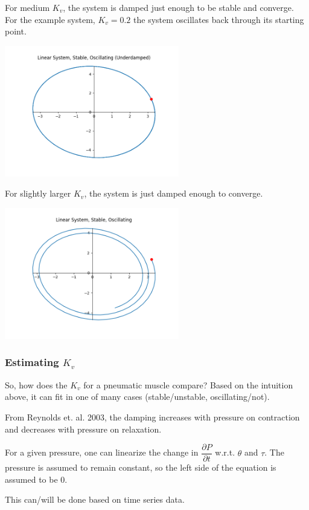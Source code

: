 \documentclass[12pt, letterpaper, oneside, notitlepage, onecolumn]{article}
\begin{document}
For medium $K_{v}$, the system is damped just enough to be stable and
converge. For the example system, $K_{v} = 0.2$ the system oscillates back
through its starting point.

\begin{center}
\includegraphics[width=3in,angle=0]{linear_pd_circleV}
\end{center}

For slightly larger $K_{v}$, the system is just damped enough to converge.

\begin{center}
\includegraphics[width=3in,angle=0]{linear_pd_mediumV}
\end{center}

\subsubsection{Estimating $K_{v}$}

So, how does the $K_{v}$ for a pneumatic muscle compare? Based on the intuition
above, it can fit in one of many cases (stable/unstable, oscillating/not).

From Reynolds et. al. 2003, the damping increases with pressure on contraction
and decreases with pressure on relaxation. 

For a given pressure, one can linearize the change in $\dfrac{\partial
P}{\partial t}$ w.r.t. $\theta$ and $\tau$. The pressure is assumed to remain
constant, so the left side of the equation is assumed to be 0.

This can/will be done based on time series data.
\end{document}

